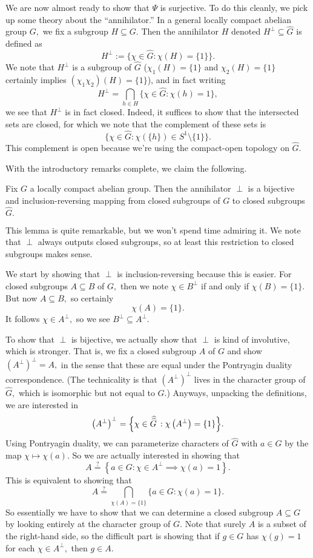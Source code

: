 We are now almost ready to show that $\Psi$ is surjective. To do this cleanly, we pick up some theory about the ``annihilator.'' In a general locally compact abelian group $G,$ we fix a subgroup $H\subseteq G.$ Then the annihilator $H$ denoted $H^\perp\subseteq\widehat G$ is defined as
\[H^\perp:=\big\{\chi\in\widehat G:\chi(H)=\{1\}\big\}.\]
We note that $H^\perp$ is a subgroup of $\widehat G$ ($\chi_1(H)=\{1\}$ and $\chi_2(H)=\{1\}$ certainly implies $(\chi_1\chi_2)(H)=\{1\}$), and in fact writing
\[H^\perp=\bigcap_{h\in H}\big\{\chi\in\widehat G:\chi(h)=1\big\},\]
we see that $H^\perp$ is in fact closed. Indeed, it suffices to show that the intersected sets are closed, for which we note that the complement of these sets is
\[\big\{\chi\in\widehat G:\chi(\{h\})\in S^1\setminus\{1\}\big\}.\]
This complement is open because we're using the compact-open topology on $\widehat G.$

With the introductory remarks complete, we claim the following.
\begin{lemma}
    Fix $G$ a locally compact abelian group. Then the annihilator $\perp$ is a bijective and inclusion-reversing mapping from closed subgroups of $G$ to closed subgroups $\widehat G.$
\end{lemma}
This lemma is quite remarkable, but we won't spend time admiring it. We note that $\perp$ always outputs closed subgroups, so at least this restriction to closed subgroups makes sense.

We start by showing that $\perp$ is inclusion-reversing because this is easier. For closed subgroups $A\subseteq B$ of $G,$ then we note $\chi\in B^\perp$ if and only if $\chi(B)=\{1\}.$ But now $A\subseteq B,$ so certainly
\[\chi(A)=\{1\}.\]
It follows $\chi\in A^\perp,$ so we see $B^\perp\subseteq A^\perp.$

To show that $\perp$ is bijective, we actually show that $\perp$ is kind of involutive, which is stronger. That is, we fix a closed subgroup $A$ of $G$ and show $\left(A^\perp\right)^\perp=A,$ in the sense that these are equal under the Pontryagin duality correspondence. (The technicality is that $\left(A^\perp\right)^\perp$ lives in the character group of $\widehat G,$ which is isomorphic but not equal to $G.$) Anyways, unpacking the definitions, we are interested in
\[\left(A^\perp\right)^\perp=\Big\{\chi\in\widehat{\smash{\widehat G}\vphantom{1^]}\,}:\chi\left(A^\perp\right)=\{1\}\Big\}.\]
Using Pontryagin duality, we can parameterize characters of $\widehat G$ with $a\in G$ by the map $\chi\mapsto\chi(a).$ So we are actually interested in showing that
\[A\stackrel?=\left\{a\in G:\chi\in A^\perp\implies\chi(a)=1\right\}.\]
This is equivalent to showing that
\[A\stackrel?=\bigcap_{\chi(A)=\{1\}}\{a\in G:\chi(a)=1\}.\]
So essentially we have to show that we can determine a closed subgroup $A\subseteq G$ by looking entirely at the character group of $G.$ Note that surely $A$ is a subset of the right-hand side, so the difficult part is showing that if $g\in G$ has $\chi(g)=1$ for each $\chi\in A^\perp,$ then $g\in A.$

